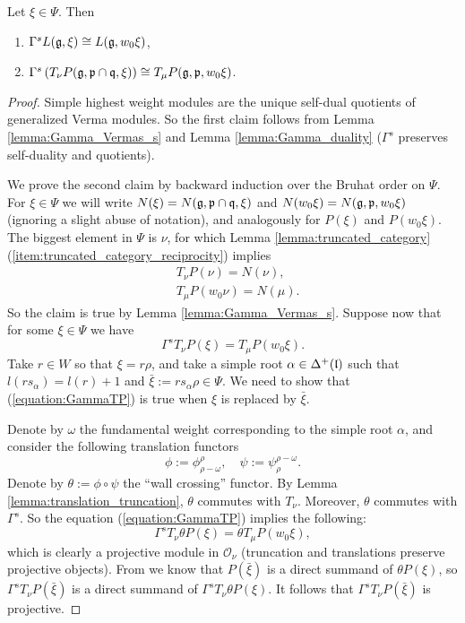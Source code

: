 \documentclass[a4paper,10pt]{article}
\begin{document}
\begin{lemma} Let $\xi \in \Psi$. Then
\label{lemma:Gamma_s_simple_projective}
\begin{enumerate}
\item \label{item:Gamma_s_simple} $\Gamma^s L(\mathfrak{g},\xi) \cong L(\mathfrak{g},w_0 \xi)$,

\item \label{item:Gamma_s_projective} $\Gamma^s \left( T_\nu P(\mathfrak{g,p\cap q},\xi) \right) \cong T_\mu P(\mathfrak{g,p},w_0\xi)$.
\end{enumerate}
\end{lemma}
%
\begin{proof}
Simple highest weight modules are the unique self-dual quotients of generalized Verma modules. So the first claim follows from Lemma \ref{lemma:Gamma_Vermas_s} and Lemma \ref{lemma:Gamma_duality} ($\Gamma^s$ preserves self-duality and quotients).

We prove the second claim by backward induction over the Bruhat order on $\Psi$. For $\xi \in \Psi$ we will write $N(\xi)=N(\mathfrak{g,p\cap q},\xi)$ and $N(w_0 \xi)=N(\mathfrak{g,p},w_0\xi)$ (ignoring a slight abuse of notation), and analogously for $P(\xi)$ and $P(w_0\xi)$. The biggest element in $\Psi$ is $\nu$, for which  Lemma \ref{lemma:truncated_category}(\ref{item:truncated_category_reciprocity}) implies
%
\begin{align*}
& T_\nu P(\nu) = N(\nu), \\
& T_\mu P(w_0\nu) = N(\mu).
\end{align*}
%
So the claim is true by Lemma \ref{lemma:Gamma_Vermas_s}. Suppose now that for some $\xi \in \Psi$ we have
%
\begin{equation}
\label{equation:GammaTP}
\Gamma^s T_\nu P(\xi) = T_\mu P(w_0 \xi).
\end{equation}
%
Take $r \in W$ so that $\xi = r \rho$, and take a simple root $\alpha \in \Delta^+(\mathfrak{l})$ such that $l(r s_\alpha)=l(r)+1$ and $\bar{\xi} :=r s_\alpha \rho \in \Psi$. We need to show that (\ref{equation:GammaTP}) is true when $\xi$ is replaced by $\bar{\xi}$.

Denote by $\omega$ the fundamental weight corresponding to the simple root $\alpha$, and consider the following translation functors
%
\[ \phi:=\phi^{{\rho}}_{{\rho}-\omega}, \quad \psi := \psi_{{\rho}}^{{\rho}-\omega}. \]
%
Denote by $\theta := \phi \circ \psi$ the ``wall crossing'' functor. By Lemma \ref{lemma:translation_truncation}, $\theta$ commutes with $T_\nu$. Moreover, $\theta$   commutes with $\Gamma^s$. So the equation (\ref{equation:GammaTP}) implies the following:
%
\begin{equation}
\label{equation:GammaTwallP}
\Gamma^s T_\nu \theta P(\xi) = \theta T_\mu P(w_0 \xi),
\end{equation}
%
which is clearly a projective module in $\mathcal{O}_\nu$ (truncation and translations preserve projective objects). From \cite[Proposition (vi) in 2.3]{irv} we know that $P(\bar{\xi})$ is a direct summand of $\theta P(\xi)$, so $\Gamma^s T_\nu P(\bar{\xi})$ is a direct summand of $\Gamma^s T_\nu \theta P(\xi)$. It follows that $\Gamma^s T_\nu P(\bar{\xi})$ is projective.


\end{proof}
\end{document}
